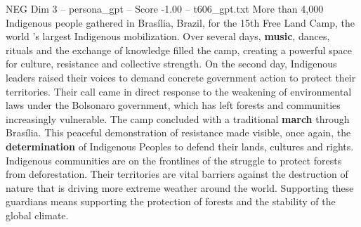 \begin{textsample}{NEG Dim 3 – persona\_gpt – Score -1.00 – t606\_gpt.txt}  \label{ex:f3_neg_034}
More than 4,000 Indigenous people gathered in Brasília, Brazil, for the 15th Free Land Camp, the world ’s largest Indigenous mobilization.
Over several days, \textbf{music}, dances, rituals and the exchange of knowledge filled the camp, creating a powerful space for culture, resistance and collective strength.
On the second day, Indigenous leaders raised their voices to demand concrete government action to protect their territories.
Their call came in direct response to the weakening of environmental laws under the Bolsonaro government, which has left forests and communities increasingly vulnerable.
The camp concluded with a traditional \textbf{march} through Brasília.
This peaceful demonstration of resistance made visible, once again, the \textbf{determination} of Indigenous Peoples to defend their lands, cultures and rights.
Indigenous communities are on the frontlines of the struggle to protect forests from deforestation.
Their territories are vital barriers against the destruction of nature that is driving more extreme weather around the world.
Supporting these guardians means supporting the protection of forests and the stability of the global climate.

\end{textsample}
